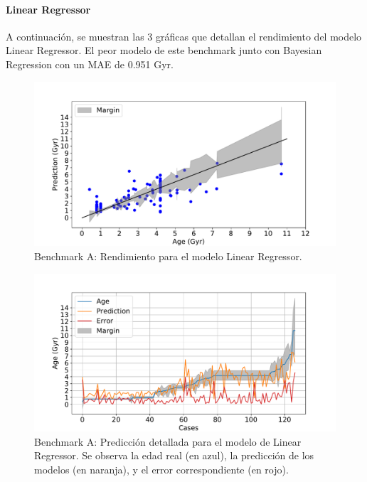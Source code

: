 \paragraph{Linear Regressor} 
A continuación, se muestran las 3 gráficas que detallan el rendimiento del modelo Linear Regressor. El peor modelo de este benchmark junto con Bayesian Regression con un MAE de 0.951 Gyr. %

\begin{figure}[H]
\begin{center}
 \includegraphics[width=0.8\linewidth]{Figuras/Experimentos/B_A_lr_1.pdf}
\end{center}
\caption{Benchmark A: Rendimiento para el modelo Linear Regressor.}
 \label{fig:benchA_details_lr_1}
\end{figure}

\begin{figure}[H]
\begin{center}
 \includegraphics[width=0.8\linewidth]{Figuras/Experimentos/B_A_lr_2.pdf}
\end{center}
\caption{Benchmark A: Predicción detallada para el modelo de Linear Regressor. Se observa la edad real (en azul), la predicción de los modelos (en naranja), y el error correspondiente (en rojo).}
 \label{fig:benchA_details_lr_2}
\end{figure}

